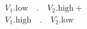 \documentclass[preview]{standalone}
\begin{document}
\begin{align*}
V_1.\text{low}\quad.\quad V_2.\text{high} + \\V_1.\text{high}\quad.\quad V_2.\text{low}
\end{align*}
\end{document}
